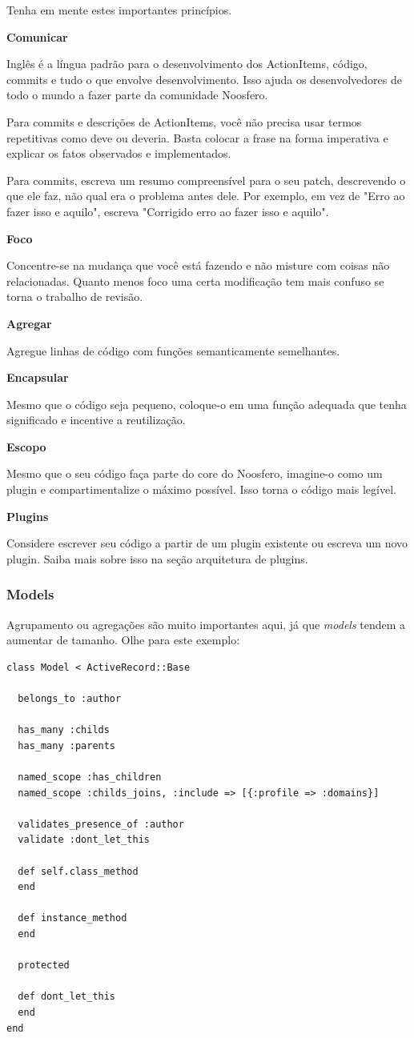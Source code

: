 \documentclass[11pt]{article}
\begin{document}
Tenha em mente estes importantes princípios.

{\bf Comunicar}

Inglês é a língua padrão para o desenvolvimento dos ActionItems, código,
commits e tudo o que envolve desenvolvimento. Isso ajuda os desenvolvedores de
todo o mundo a fazer parte da comunidade Noosfero.

Para commits e descrições de ActionItems, você não precisa usar termos
repetitivas como deve ou deveria. Basta colocar a frase na forma imperativa e
explicar os fatos observados e implementados.

Para commits, escreva um resumo compreensível para o seu patch, descrevendo o
que ele faz, não qual era o problema antes dele. Por exemplo, em vez de "Erro
ao fazer isso e aquilo", escreva "Corrigido erro ao fazer isso e aquilo".

{\bf Foco}

Concentre-se na mudança que você está fazendo e não misture com coisas não
relacionadas. Quanto menos foco uma certa modificação tem mais confuso se
torna o trabalho de revisão.

{\bf Agregar}

Agregue linhas de código com funções semanticamente semelhantes.

{\bf Encapsular}

Mesmo que o código seja pequeno, coloque-o em uma função adequada que tenha
significado e incentive a reutilização.

{\bf Escopo}

Mesmo que o seu código faça parte do core do Noosfero, imagine-o como um
plugin e compartimentalize o máximo possível. Isso torna o código mais
legível.

{\bf Plugins}

Considere escrever seu código a partir de um plugin existente ou escreva um
novo plugin. Saiba mais sobre isso na seção arquitetura de plugins.

\subsubsection{Models}

Agrupamento ou agregações são muito importantes aqui, já que {\it models}
tendem a aumentar de tamanho. Olhe para este exemplo:

\begin{Verbatim}[frame=single,fontfamily=courier]
class Model < ActiveRecord::Base
 
  belongs_to :author
 
  has_many :childs
  has_many :parents
 
  named_scope :has_children
  named_scope :childs_joins, :include => [{:profile => :domains}]
 
  validates_presence_of :author
  validate :dont_let_this
 
  def self.class_method
  end
 
  def instance_method
  end
 
  protected
 
  def dont_let_this
  end
end
\end{Verbatim}
\end{document}
